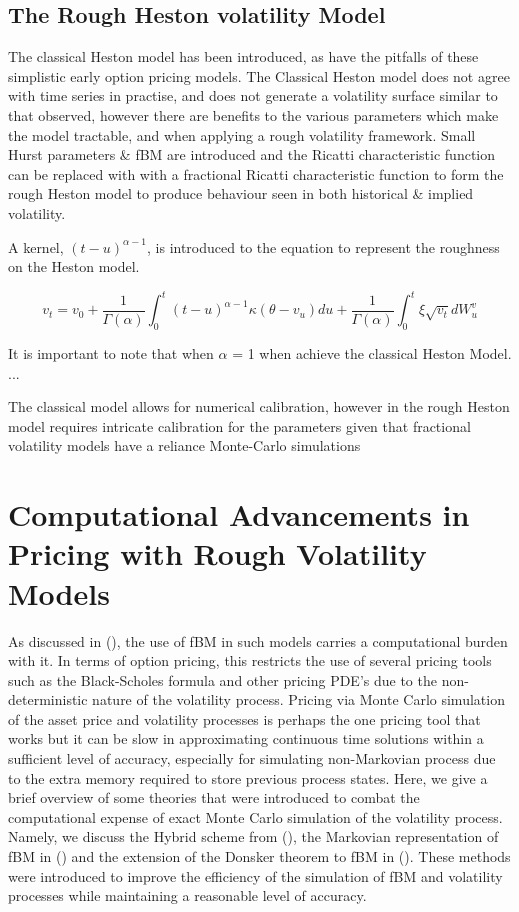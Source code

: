 \documentclass[12pt,oneside]{article}
\begin{document}
\subsection{The Rough Heston volatility Model}
\label{sebsec:rough_heston}
The classical Heston model has been introduced, as have the pitfalls  of these simplistic early option pricing models. The Classical Heston model does not agree with time series in practise, and does not generate a volatility surface similar to that observed, however there are benefits to the various parameters which make the model tractable, and when applying a rough volatility framework. Small Hurst parameters & fBM are introduced and the Ricatti characteristic function can be replaced with with a fractional Ricatti characteristic function to form the rough Heston model to produce behaviour seen in both historical & implied volatility.

A kernel, $(t-u)^{\alpha-1}$, is introduced to the equation to represent the roughness on the Heston model. 

$$v_t = v_0 + \frac{1}{\Gamma(\alpha)} \int_{0}^{t} (t-u)^{\alpha-1} \kappa (\theta - v_u)du + \frac{1}{\Gamma(\alpha)} \int_{0}^{t} \xi\sqrt{v_t}dW_u^{v}$$

It is important to note that when $\alpha$ = 1 when achieve the classical Heston Model. ...

The classical model allows for numerical calibration, however in the rough Heston model requires intricate calibration for the parameters given that fractional volatility models have a reliance Monte-Carlo simulations 

\section{Computational Advancements in Pricing with Rough Volatility Models}
\label{sec:comp_advamcement}

As discussed in (\cite{OUMGARI}),  the use of fBM in such models carries a computational burden with it. In terms of option pricing, this restricts the use of several pricing tools such as the Black-Scholes formula and other pricing PDE's due to the non-deterministic nature of the volatility process.  Pricing via Monte Carlo simulation of the asset price and volatility processes is perhaps the one pricing tool that works but it can be slow in approximating continuous time solutions within a sufficient level of accuracy, especially for simulating non-Markovian process due to the extra memory required to store previous process states. Here, we give a brief overview of some theories that were introduced to combat the computational expense of exact Monte Carlo simulation of the volatility process. Namely, we discuss the Hybrid scheme from (\cite{BENNEDSON}), the Markovian representation of fBM in (\cite{HARMS}) and the extension of the Donsker theorem to fBM in (\cite{MUGURUZA}). These methods were introduced to improve the efficiency of the simulation of fBM and volatility processes while maintaining a reasonable level of accuracy.
\end{document}
